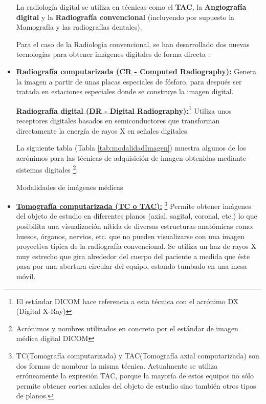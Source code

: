 \begin{itemize}
La radiología digital se utiliza en técnicas como el \textbf{TAC}, la \textbf{Angiografía digital} y la \textbf{Radiografía convencional} (incluyendo por supuesto la Mamografía y las radiografías dentales). 

Para el caso de la Radiología convencional, se han desarrollado dos nuevas tecnologías para obtener imágenes digitales de forma directa \cite{9}: 

\item \textbf{\underline{Radiografía computarizada (CR - Computed Radiography):}} Genera la
imagen a partir de unas placas especiales de fósforo, para después ser tratada en estaciones especiales donde se construye la imagen digital.
 
\textbf{\underline{Radiografía digital (DR - Digital Radiography):}}\footnote{El estándar DICOM hace referencia a esta técnica con el acrónimo DX (Digital X-Ray)} Utiliza unos receptores digitales basados en semiconductores que transforman directamente la energía
de rayos X en señales digitales.

La siguiente tabla (Tabla \ref{tab:modalidadImagen}) muestra algunos de los acrónimos para las técnicas de adquisición de imagen obtenidas mediante sistemas digitales \footnote{Acrónimos y nombres utilizados en concreto por el estándar de imagen médica digital DICOM}:

\begin{table}[hp]
\centering{
\small
}
\caption{Modalidades de imágenes médicas}
\label{modalidadImagen}
\end{table}

\item \textbf{\underline{Tomografía computarizada (TC o TAC):}} \footnote{TC(Tomografía computarizada) y TAC(Tomografía axial computarizada) son dos formas de nombrar la misma técnica. Actualmente se utiliza erróneamente la expresión TAC, porque la mayoría de estos equipos no sólo permite obtener cortes axiales del objeto de estudio sino también otros tipos de planos.} Permite obtener imágenes del objeto de estudio en diferentes planos (axial, sagital, coronal, etc.) lo que posibilita una visualización nítida de diversas estructuras anatómicas como: huesos, órganos, nervios, etc. que no pueden visualizarse con una imagen proyectiva típica de la radiografía convencional. Se utiliza un haz de rayos X muy estrecho que gira alrededor del cuerpo del paciente a medida que éste pasa por una abertura circular del equipo, estando tumbado en una mesa móvil.


\end{itemize}
